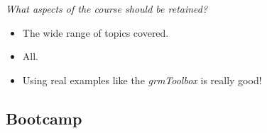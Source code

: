 \begin{boenumerate}
\begin{itemize}
\end{itemize}
\item \textit{What aspects of the course should be retained?}
\begin{itemize}
\item The wide range of topics covered.
\item All.
\item Using real examples like the \textit{grmToolbox} is really good!
\end{itemize}
\end{boenumerate}


\newpage
\subsection{Bootcamp}

